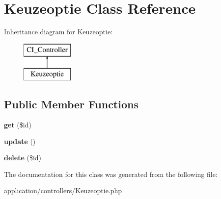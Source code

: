 \hypertarget{class_keuzeoptie}{}\section{Keuzeoptie Class Reference}
\label{class_keuzeoptie}
Inheritance diagram for Keuzeoptie\+:\begin{figure}[H]
\begin{center}
\leavevmode
\includegraphics[height=2.000000cm]{class_keuzeoptie}
\end{center}
\end{figure}
\subsection*{Public Member Functions}
\begin{DoxyCompactItemize}
\item 
\mbox{\label{class_keuzeoptie_a50e3bfb586b2f42932a6a93f3fbb0828}} 
{\bfseries get} (\$id)
\item 
\mbox{\label{class_keuzeoptie_a842e4774e3b3601a005b995c02f7e883}} 
{\bfseries update} ()
\item 
\mbox{\label{class_keuzeoptie_a2f8258add505482d7f00ea26493a5723}} 
{\bfseries delete} (\$id)
\end{DoxyCompactItemize}


The documentation for this class was generated from the following file\+:\begin{DoxyCompactItemize}
\item 
application/controllers/Keuzeoptie.\+php\end{DoxyCompactItemize}
